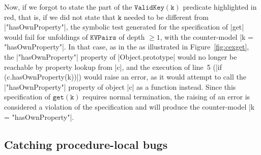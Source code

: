Now, if we forgot to state the part of the $\mathtt{ValidKey(k)}$ predicate highlighted in red, that is, if we did not state that $\mathtt{k}$ needed to be different from \jsinline|"hasOwnProperty"|, the symbolic test generated for the specification of \jsinline|get| would fail for unfoldings of $\mathtt{KVPairs}$ of depth $\geq 1$, with the counter-model \jsinline|k = "hasOwnProperty"|. 
In that case, as in the as illustrated in Figure~\ref{fig:cexget}, the \jsinline|"hasOwnProperty"| property of \jsinline|Object.prototype| would no longer be reachable by property lookup from \jsinline|c|, and
the execution of line~5 (\jsinline|if (c.hasOwnProperty(k))|) would raise an error, as it would attempt to call the \jsinline|"hasOwnProperty"| property of object \jsinline|c| as a function instead. 
Since this specification of $\mathtt{get(k)}$ requires normal termination, the raising of an error is considered a violation of the specification and 
\jilette will produce the counter-model \jsinline|k = "hasOwnProperty"|.

\subsection{Catching procedure-local bugs}


